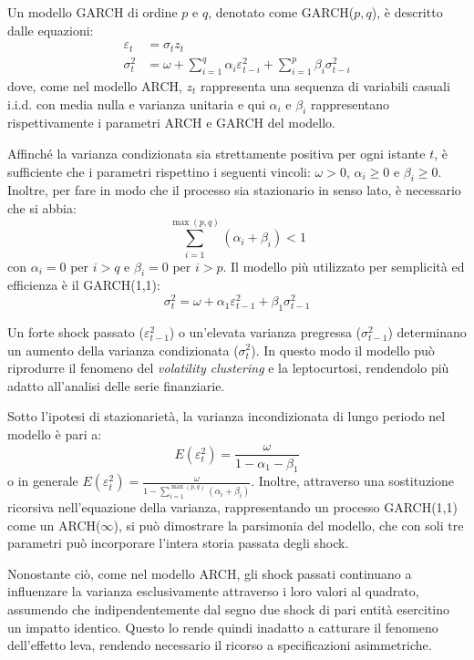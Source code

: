 Un modello GARCH di ordine $p$ e $q$, denotato come GARCH($p,q$), è descritto dalle equazioni:
\begin{align*}
    \varepsilon_t &= \sigma_t z_t \\
    \sigma_t^2 &= \omega + \sum_{i=1}^q \alpha_i \varepsilon_{t-i}^2 + \sum_{i=1}^p \beta_i \sigma_{t-i}^2
\end{align*}
dove, come nel modello ARCH, $z_t$ rappresenta una sequenza di variabili casuali i.i.d. con media nulla e varianza unitaria e qui $\alpha_i$ e $\beta_i$ rappresentano rispettivamente i parametri ARCH e GARCH del modello.

Affinché la varianza condizionata sia strettamente positiva per ogni istante $t$, è sufficiente che i parametri rispettino i seguenti vincoli: $\omega > 0$, $\alpha_i \geq 0$ e $\beta_i \geq 0$. Inoltre, per fare in modo che il processo sia stazionario in senso lato, è necessario che si abbia:
\[
    \sum_{i=1}^{\max(p,q)} (\alpha_i + \beta_i) < 1
\]
con $\alpha_i = 0$ per $i > q$ e $\beta_i = 0$ per $i > p$. 
Il modello più utilizzato per semplicità ed efficienza è il GARCH(1,1):
\[
    \sigma_t^2 = \omega + \alpha_1 \varepsilon_{t-1}^2 + \beta_1 \sigma_{t-1}^2
\]

Un forte shock passato ($\varepsilon_{t-1}^2$) o un'elevata varianza pregressa ($\sigma_{t-1}^2$) determinano un aumento della varianza condizionata ($\sigma_t^2$). 
In questo modo il modello può riprodurre il fenomeno del \emph{volatility clustering} e la leptocurtosi, rendendolo più adatto all'analisi delle serie finanziarie.

Sotto l'ipotesi di stazionarietà, la varianza incondizionata di lungo periodo nel modello è pari a:
\[
    E(\varepsilon_t^2) = \frac{\omega}{1-\alpha_1-\beta_1}
\]
o in generale $E(\varepsilon_t^2) = \frac{\omega}{1 - \sum_{i=1}^{\max(p,q)} (\alpha_i + \beta_i)}$. 
Inoltre, attraverso una sostituzione ricorsiva nell'equazione della varianza, rappresentando un processo GARCH(1,1) come un ARCH($\infty$), si può dimostrare la parsimonia del modello, che con soli tre parametri può incorporare l'intera storia passata degli shock.

Nonostante ciò, come nel modello ARCH, gli shock passati continuano a influenzare la varianza esclusivamente attraverso i loro valori al quadrato, assumendo che indipendentemente dal segno due shock di pari entità esercitino un impatto identico. Questo lo rende quindi inadatto a catturare il fenomeno dell'effetto leva, rendendo necessario il ricorso a specificazioni asimmetriche.


